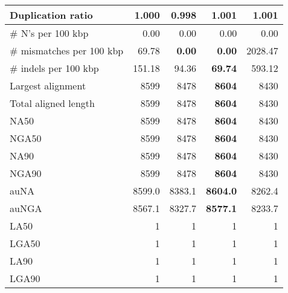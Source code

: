 \documentclass[12pt,a4paper]{article}
\begin{document}
\begin{table}[ht]
\begin{center}
\begin{tabular}{|l*{4}{|r}|}
Duplication ratio & 1.000 & {\bf 0.998} & 1.001 & 1.001 \\ \hline
\# N's per 100 kbp & 0.00 & 0.00 & 0.00 & 0.00 \\ \hline
\# mismatches per 100 kbp & 69.78 & {\bf 0.00} & {\bf 0.00} & 2028.47 \\ \hline
\# indels per 100 kbp & 151.18 & 94.36 & {\bf 69.74} & 593.12 \\ \hline
Largest alignment & 8599 & 8478 & {\bf 8604} & 8430 \\ \hline
Total aligned length & 8599 & 8478 & {\bf 8604} & 8430 \\ \hline
NA50 & 8599 & 8478 & {\bf 8604} & 8430 \\ \hline
NGA50 & 8599 & 8478 & {\bf 8604} & 8430 \\ \hline
NA90 & 8599 & 8478 & {\bf 8604} & 8430 \\ \hline
NGA90 & 8599 & 8478 & {\bf 8604} & 8430 \\ \hline
auNA & 8599.0 & 8383.1 & {\bf 8604.0} & 8262.4 \\ \hline
auNGA & 8567.1 & 8327.7 & {\bf 8577.1} & 8233.7 \\ \hline
LA50 & 1 & 1 & 1 & 1 \\ \hline
LGA50 & 1 & 1 & 1 & 1 \\ \hline
LA90 & 1 & 1 & 1 & 1 \\ \hline
LGA90 & 1 & 1 & 1 & 1 \\ \hline
\end{tabular}
\end{center}
\end{table}
\end{document}
